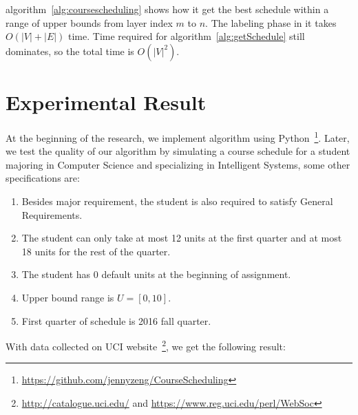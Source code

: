 \documentclass[letterpaper,12pt]{article}
\theoremstyle{definition}
\begin{document}
algorithm~\ref{alg:coursescheduling} shows how it get the best schedule within a range of upper bounds from layer index $m$ to $n$. The labeling phase in it takes $O(|V|+|E|)$ time. Time required for algorithm~\ref{alg:getSchedule} still dominates, so the total time is $O(|V|^2)$.

\section{Experimental Result}


At the beginning of the research, we implement algorithm using Python~\footnote{\url{https://github.com/jennyzeng/CourseScheduling}}. Later, we test the quality of our algorithm by simulating a course schedule for a student majoring in Computer Science and specializing in Intelligent Systems, some other specifications are:
\begin{enumerate}
    \item Besides major requirement, the student is also required to satisfy General Requirements.
    \item The student can only take at most 12 units at the first quarter and at most 18 units for the rest of the quarter. 
    \item The student has 0 default units at the beginning of assignment.
    \item Upper bound range is $U=[0,10]$.
    \item First quarter of schedule is 2016 fall quarter. 
\end{enumerate}
With data collected on UCI website~\footnote{\url{http://catalogue.uci.edu/} and \url{https://www.reg.uci.edu/perl/WebSoc}}, we get the following result:
\end{document}
